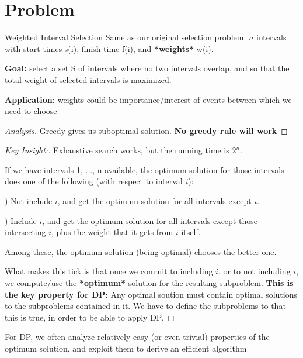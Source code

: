 \documentclass[openany]{article}
\begin{document}
\section*{Problem}
\begin{problem*}{Weighted Interval Selection}
    Same as our original selection problem:
    $n$ intervals with start times s(i), finish time f(i), and \textbf{*weights*} w(i).

    \textbf{Goal:} select a set S of intervals where no two intervals overlap, and so that the total weight of selected intervals is maximized.

    \textbf{Application:} weights could be importance/interest of events between which we need to choose
\end{problem*}

\begin{proof}[Analysis]{}
		\renewcommand{\qedsymbol}{} %
        Greedy gives us suboptimal solution. \textbf{No greedy rule will work}
\end{proof}
\begin{proof}[Key Insight:]{}
		\renewcommand{\qedsymbol}{} %
        Exhaustive search works, but the running time is $2^n$. 

        If we have intervals 1, ..., n available, the optimum solution for those intervals does one of the following (with respect to interval $i$):

        ) Not include $i$, and get the optimum solution for all intervals except $i$.
        
        ) Include $i$, and get the optimum solution for all intervals except those intersecting $i$, plus the weight that it gets from $i$ itself.

        \qquad Among these, the optimum solution (being optimal) chooses the better one.

        What makes this tick is that once we commit to including $i$, or to not including $i$, we compute/use the \textbf{*optimum*} solution for the resulting subproblem. \textbf{This is the key property for DP:} Any optimal soution must contain optimal solutions to the subproblems contained in it. We have to define the subproblems to that this is true, in order to be able to apply DP.
\end{proof}

\begin{theorem*}{}
    For DP, we often analyze relatively easy (or even trivial) properties of the optimum solution, and exploit them to derive an efficient algorithm
\end{theorem*}
\end{document}
